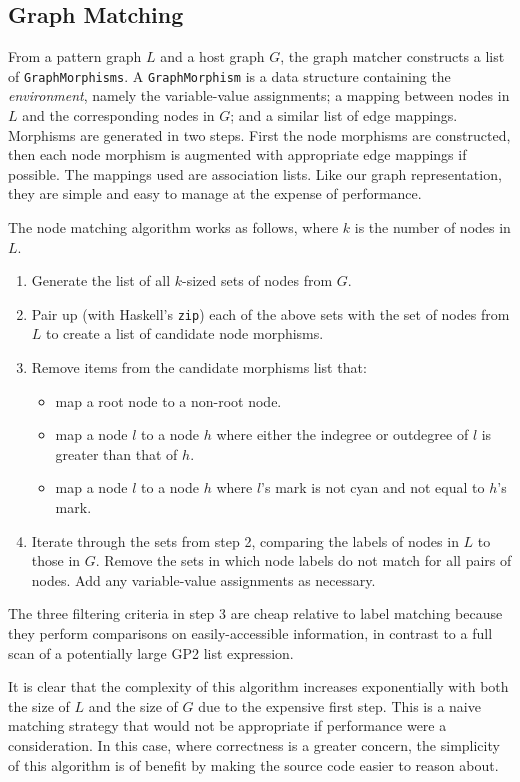 \subsection{Graph Matching}

From a pattern graph $L$ and a host graph $G$, the graph matcher constructs a list of \texttt{GraphMorphisms}. A \texttt{GraphMorphism} is a data structure containing the \textit{environment}, namely the variable-value assignments; a mapping between nodes in $L$ and the corresponding nodes in $G$; and a similar list of edge mappings. Morphisms are generated in two steps. First the node morphisms are constructed, then each node morphism is augmented with appropriate edge mappings if possible. The mappings used are association lists. Like our graph representation, they are simple and easy to manage at the expense of performance.

The node matching algorithm works as follows, where $k$ is the number of nodes in $L$. 

\begin{enumerate}
\item Generate the list of all $k$-sized sets of nodes from $G$.
\item Pair up (with Haskell's \texttt{zip}) each of the above sets with the set of nodes from $L$ to create a list of candidate node morphisms.
\item Remove items from the candidate morphisms list that:
  \begin{itemize}
  \item map a root node to a non-root node.
  \item map a node $l$ to a node $h$ where either the indegree or outdegree of $l$ is greater than that of $h$.
  \item map a node $l$ to a node $h$ where $l$'s mark is not cyan and not equal to $h$'s mark.
  \end{itemize}
\item Iterate through the sets from step 2, comparing the labels of nodes in $L$ to those in $G$. Remove the sets in which node labels do not match for all pairs of nodes. Add any variable-value assignments as necessary.
\end{enumerate}

The three filtering criteria in step 3 are cheap relative to label matching because they perform comparisons on easily-accessible information, in contrast to a full scan of a potentially large GP2 list expression.

It is clear that the complexity of this algorithm increases exponentially with both the size of $L$ and the size of $G$ due to the expensive first step. This is a naive matching strategy that would not be appropriate if performance were a consideration. In this case, where correctness is a greater concern, the simplicity of this algorithm is of benefit by making the source code easier to reason about.


